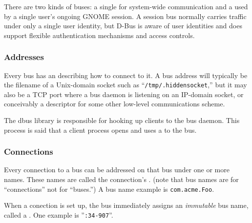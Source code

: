 \documentclass{myproc}
\begin{document}
There are two kinds of buses: a single  for system-wide
communication and a  used by a single user's ongoing GNOME
session. A session bus normally carries traffic under only a single user
identity, but D-Bus is aware of user identities and does support flexible
authentication mechanisms and access controls. 

\subsubsection{Addresses}
Every bus has an  describing how to connect to it. A bus address
will typically be the filename of a Unix-domain socket such as
``\verb+/tmp/.hiddensocket+,'' but it may also be a TCP port where a bus
daemon is listening on an IP-domain socket, or conceivably a descriptor for
some other low-level communications scheme.

The dbus library is responsible for hooking up clients to the bus daemon. This
process is said that a client process opens and uses a  to the
bus. 

\subsubsection{Connections}
Every connection to a bus can be addressed on that bus under one or more
names. These names are called the connection's . (note that bus
names are for ``connections'' not for ``buses.'') A bus name example is
\verb+com.acme.Foo+. 

When a conection is set up, the bus immediately assigns an {\em immutable\/}
bus name, called a . One example is
''\verb+:34-907+''. 


\end{document}
